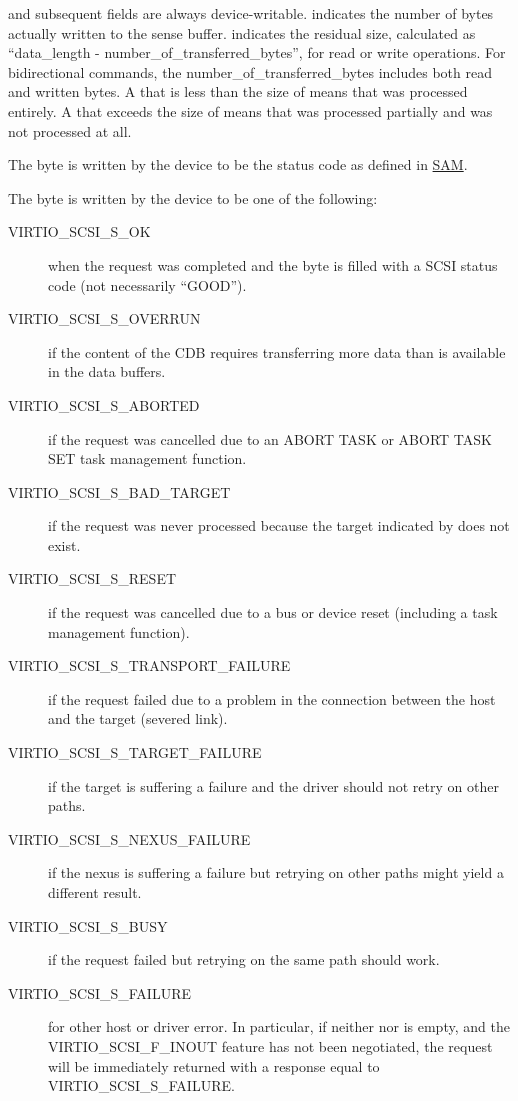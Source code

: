  and subsequent fields are always device-writable. 
indicates the number of bytes actually written to the sense
buffer.  indicates the residual size,
calculated as ``data_length - number_of_transferred_bytes'', for
read or write operations. For bidirectional commands, the
number_of_transferred_bytes includes both read and written bytes.
A  that is less than the size of  means that
 was processed entirely. A  that
exceeds the size of  means that  was
processed partially and  was not processed at
all.

The  byte is written by the device to be the status code as
defined in \hyperref[intro:SAM]{SAM}.

The  byte is written by the device to be one of the
following:

\begin{description}

\item[VIRTIO_SCSI_S_OK] when the request was completed and the 
  byte is filled with a SCSI status code (not necessarily
  ``GOOD'').

\item[VIRTIO_SCSI_S_OVERRUN] if the content of the CDB requires
  transferring more data than is available in the data buffers.

\item[VIRTIO_SCSI_S_ABORTED] if the request was cancelled due to an
  ABORT TASK or ABORT TASK SET task management function.

\item[VIRTIO_SCSI_S_BAD_TARGET] if the request was never processed
  because the target indicated by  does not exist.

\item[VIRTIO_SCSI_S_RESET] if the request was cancelled due to a bus
  or device reset (including a task management function).

\item[VIRTIO_SCSI_S_TRANSPORT_FAILURE] if the request failed due to a
  problem in the connection between the host and the target
  (severed link).

\item[VIRTIO_SCSI_S_TARGET_FAILURE] if the target is suffering a
  failure and the driver should not retry on other paths.

\item[VIRTIO_SCSI_S_NEXUS_FAILURE] if the nexus is suffering a failure
  but retrying on other paths might yield a different result.

\item[VIRTIO_SCSI_S_BUSY] if the request failed but retrying on the
  same path should work.

\item[VIRTIO_SCSI_S_FAILURE] for other host or driver error. In
  particular, if neither  nor  is empty, and the
  VIRTIO_SCSI_F_INOUT feature has not been negotiated, the
  request will be immediately returned with a response equal to
  VIRTIO_SCSI_S_FAILURE.
\end{description}

